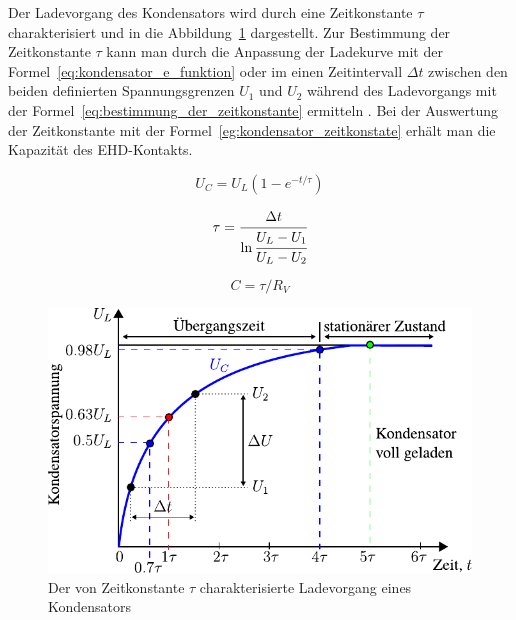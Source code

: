 Der Ladevorgang des Kondensators wird durch eine Zeitkonstante $\tau$ charakterisiert und in die Abbildung~\ref{fig:ladevorgang_eines_kondensators} dargestellt.
Zur Bestimmung der Zeitkonstante $\tau$ kann man durch die Anpassung der Ladekurve mit der Formel~\ref{eq:kondensator_e_funktion} oder im einen Zeitintervall $\Delta t$ zwischen den beiden definierten Spannungsgrenzen $U_1$ und $U_2$ während des Ladevorgangs mit der Formel~\ref{eq:bestimmung_der_zeitkonstante} ermitteln .
Bei der Auswertung der Zeitkonstante mit der Formel~\ref{eg:kondensator_zeitkonstate} erhält man die Kapazität des EHD-Kontakts.

\begin{minipage}[b]{0.3\textwidth}
    \begin{equation}
        U_C = U_L (1 - e ^ {-t/\tau})
        \label{eq:kondensator_e_funktion}
    \end{equation}
\end{minipage}
%
\begin{minipage}[b]{0.3\textwidth}
    \begin{equation}
        \tau = \cfrac{\Delta t}{\ln \cfrac{U_L - U_1}{U_L - U_2}}
        \label{eq:bestimmung_der_zeitkonstante}
    \end{equation}
\end{minipage}
%
\begin{minipage}[b]{0.3\textwidth}
    \begin{equation}
        C = \tau / R_V
        \label{eg:kondensator_zeitkonstate}
    \end{equation}
\end{minipage}

\begin{figure}[htb]
    \centering
    \includegraphics[]{./images/kondensator_ladevorgang.pdf}
    \caption{Der von Zeitkonstante $\tau$ charakterisierte Ladevorgang eines Kondensators}
    \label{fig:ladevorgang_eines_kondensators}
\end{figure}

